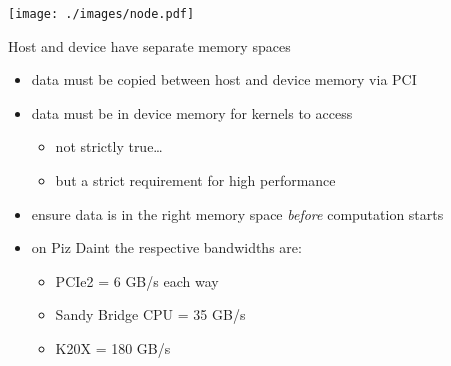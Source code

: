 
\begin{frame}[fragile]{}
    \begin{center}
        \texttt{[image: ./images/node.pdf]}
    \end{center}
\end{frame}

\begin{frame}[fragile]{}
    \begin{info}{Host and device have separate memory spaces}
        \begin{itemize}
            \item data must be copied between host and device memory via PCI
            \item data must be in device memory for kernels to access
                \begin{itemize}
                    \item not strictly true\ldots
                    \item but a strict requirement for high performance
                \end{itemize}
            \item ensure data is in the right memory space \emph{before} computation starts
            \item on Piz Daint the respective bandwidths are:
            \begin{itemize}
                \item PCIe2 = 6 GB/s each way
                \item Sandy Bridge CPU = 35 GB/s
                \item K20X  = 180 GB/s
            \end{itemize}
        \end{itemize}
    \end{info}

\end{frame}

